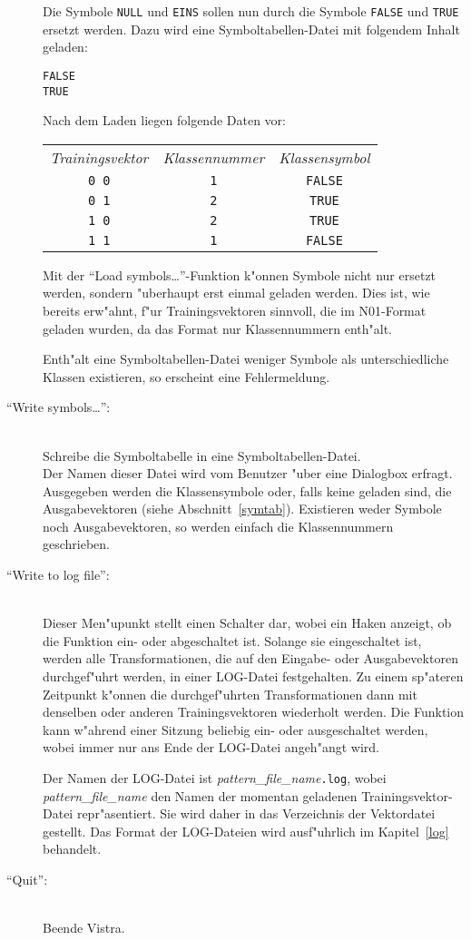 \begin{description}
Die Symbole {\tt NULL} und {\tt EINS} sollen nun durch die Symbole
{\tt FALSE} und {\tt TRUE} ersetzt werden.
Dazu wird eine Symboltabellen-Datei mit folgendem Inhalt geladen: 
\begin{verbatim}
FALSE
TRUE
\end{verbatim}
Nach dem Laden liegen folgende Daten vor: 

\begin{tabular}{ccc}
{\sl Trainingsvektor} & {\sl Klassennummer} & {\sl Klassensymbol} \\[1ex]
{\tt 0 0} & {\tt 1} & {\tt FALSE} \\
{\tt 0 1} & {\tt 2} & {\tt TRUE} \\
{\tt 1 0} & {\tt 2} & {\tt TRUE} \\
{\tt 1 1} & {\tt 1} & {\tt FALSE} \\
\end{tabular}  

Mit der "`Load symbols\ldots"'-Funktion k"onnen Symbole nicht nur
ersetzt werden, sondern "uberhaupt erst einmal geladen werden.
Dies ist, wie bereits erw"ahnt, f"ur Trainingsvektoren sinnvoll, die 
im N01-Format geladen wurden, da das Format nur Klassennummern enth"alt.

Enth"alt eine Symboltabellen-Datei weniger Symbole als unterschiedliche
Klassen existieren, so erscheint eine Fehlermeldung.

\item["`Write symbols\ldots"':] \mbox{} \\
Schreibe die Symboltabelle in eine Symboltabellen-Datei. \\
Der Namen dieser Datei wird vom Benutzer "uber eine Dialogbox erfragt.
Ausgegeben werden die Klassensymbole oder, falls keine geladen sind,
die Ausgabevektoren (siehe Abschnitt~\ref{symtab}).
Existieren weder Symbole noch Ausgabevektoren, so werden einfach die
Klassennummern geschrieben.
  
\item["`Write to log file"':] \mbox{} \\ 
Dieser Men"upunkt stellt einen Schalter 
dar, wobei ein Haken anzeigt, ob die Funktion ein- oder abgeschaltet ist.
Solange sie eingeschaltet ist, werden alle Transformationen, die
auf den Eingabe- oder Ausgabevektoren durchgef"uhrt werden, in einer
LOG-Datei festgehalten.
Zu einem sp"ateren Zeitpunkt k"onnen die durchgef"uhrten Transformationen
dann mit denselben oder anderen Trainingsvektoren wiederholt werden.
Die Funktion kann w"ahrend einer Sitzung beliebig ein- oder ausgeschaltet
werden, wobei immer nur ans Ende der LOG-Datei angeh"angt wird.

Der Namen der LOG-Datei ist {\it pattern\_file\_name}{\tt\/.log},
wobei {\it pattern\_file\_name} den Namen der momentan  
geladenen Trainingsvektor-Datei repr"asentiert.
Sie wird daher in das Verzeichnis der Vektordatei gestellt.  
Das Format der LOG-Dateien wird ausf"uhrlich 
im Kapitel~\ref{log} behandelt.

\item["`Quit"':] \mbox{} \\
Beende Vistra.  
\end{description}

